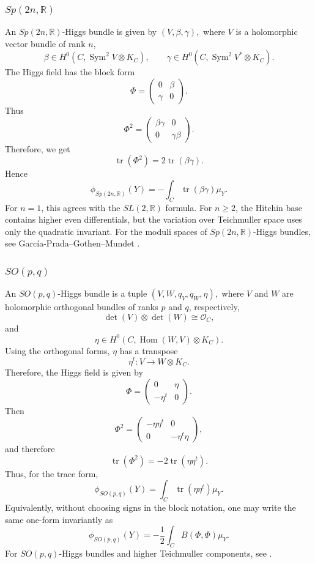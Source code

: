 \documentclass[11pt,reqno]{amsart}
\numberwithin{equation}{section}
\theoremstyle{plain}
\theoremstyle{definition}
\theoremstyle{remark}
\begin{document}
\subsubsection{\texorpdfstring{\(Sp(2n,\mathbb R)\)}{Sp(2n,R)}}

An \(Sp(2n,\mathbb R)\)-Higgs bundle is given by
\(
        (V,\beta,\gamma),
\)
where \(V\) is a holomorphic vector bundle of rank \(n\),
\[
        \beta\in H^0(C,\operatorname{Sym}^2V\otimes K_C),
        \qquad
        \gamma\in H^0(C,\operatorname{Sym}^2V^*\otimes K_C).
\]
The Higgs field has the block form
\[
        \Phi=
        \begin{pmatrix}
        0&\beta\\
        \gamma&0
        \end{pmatrix}.
\]
Thus
\[
        \Phi^2=
        \begin{pmatrix}
        \beta\gamma&0\\
        0&\gamma\beta
        \end{pmatrix}.
\]
Therefore, we get
\[
        \operatorname{tr}(\Phi^2)
        =
        2\operatorname{tr}(\beta\gamma).
\]
Hence
\[
        \phi_{Sp(2n,\mathbb R)}(Y)
        =
        -\int_C\operatorname{tr}(\beta\gamma)\mu_Y.
\]
For \(n=1\), this agrees with the \(SL(2,\mathbb R)\) formula.  For
\(n\geq2\), the Hitchin base contains higher even differentials, but the
variation over Teichmuller space uses only the quadratic invariant. For the
moduli spaces of \(Sp(2n,\mathbb R)\)-Higgs bundles, see
García-Prada--Gothen--Mundet \cite{GPGM}.

\subsubsection{\texorpdfstring{\(SO(p,q)\)}{SO(p,q)}}

An \(SO(p,q)\)-Higgs bundle is a tuple
\(
        (V,W,q_V,q_W,\eta),
\)
where \(V\) and \(W\) are holomorphic orthogonal bundles of ranks \(p\) and
\(q\), respectively,
\[
        \det(V)\otimes\det(W)\cong\mathcal O_C,
\]
and
\[
        \eta\in H^0(C,\operatorname{Hom}(W,V)\otimes K_C).
\]
Using the orthogonal forms, \(\eta\) has a transpose
\[
        \eta^t:V\longrightarrow W\otimes K_C.
\]
Therefore, the Higgs field is given by
\[
        \Phi=
        \begin{pmatrix}
        0&\eta\\
        -\eta^t&0
        \end{pmatrix}.
\]
Then
\[
        \Phi^2=
        \begin{pmatrix}
        -\eta\eta^t&0\\
        0&-\eta^t\eta
        \end{pmatrix},
\]
and therefore
\[
        \operatorname{tr}(\Phi^2)
        =
        -2\operatorname{tr}(\eta\eta^t).
\]
Thus, for the trace form,
\[
        \phi_{SO(p,q)}(Y)
        =
        \int_C\operatorname{tr}(\eta\eta^t)\mu_Y.
\]
Equivalently, without choosing signs in the block notation, one may write the
same one-form invariantly as
\[
        \phi_{SO(p,q)}(Y)
        =
        -\frac12\int_C B(\Phi,\Phi)\mu_Y.
\]
For \(SO(p,q)\)-Higgs bundles and higher Teichmuller components, see
\cite{ABCO}.
\end{document}
